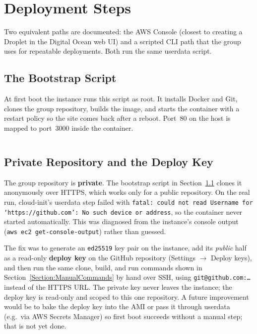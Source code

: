 \section{Deployment Steps}
Two equivalent paths are documented: the AWS Console (closest to creating a
Droplet in the Digital Ocean web UI) and a scripted CLI path that the group uses
for repeatable deployments. Both run the same \gls{userdata} script.

\subsection{The Bootstrap Script}
\label{Section:Bootstrap}
At first boot the instance runs this script as root. It installs Docker and Git,
clones the group repository, builds the image, and starts the container with a
restart policy so the site comes back after a reboot. Port~80 on the host is
mapped to port~3000 inside the container.
\inputminted{bash}{../deploy/aws/ec2-user-data.sh}

\subsection{Private Repository and the Deploy Key}
\label{Section:DeployKey}
\begin{devopsNote}
The group repository is \textbf{private}. The bootstrap script in
Section~\ref{Section:Bootstrap} clones it anonymously over HTTPS, which works
only for a public repository. On the real run, cloud-init's \gls{userdata}
step failed with \texttt{fatal: could not read Username for
`https://github.com': No such device or address}, so the container never
started automatically. This was diagnosed from the instance's console output
(\texttt{aws ec2 get-console-output}) rather than guessed.

The fix was to generate an \texttt{ed25519} key pair on the instance, add its
\emph{public} half as a read-only \textbf{deploy key} on the GitHub repository
(Settings $\rightarrow$ Deploy keys), and then run the same clone, build, and
run commands shown in Section~\ref{Section:ManualCommands} by hand over SSH,
using \texttt{git@github.com:\dots} instead of the HTTPS URL. The private key
never leaves the instance; the deploy key is read-only and scoped to this one
repository. A future improvement would be to bake the deploy key into the AMI
or pass it through \gls{userdata} (e.g.\ via AWS Secrets Manager) so first
boot succeeds without a manual step; that is not yet done.
\end{devopsNote}

